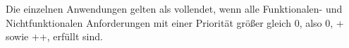 Die einzelnen Anwendungen gelten als vollendet, wenn alle Funktionalen- und Nichtfunktionalen Anforderungen mit einer Priorität größer gleich \glqq{}0\grqq{}, also \glqq{}0\grqq{}, \glqq{}+\grqq{} sowie \glqq{}++\grqq{}, erfüllt sind.
